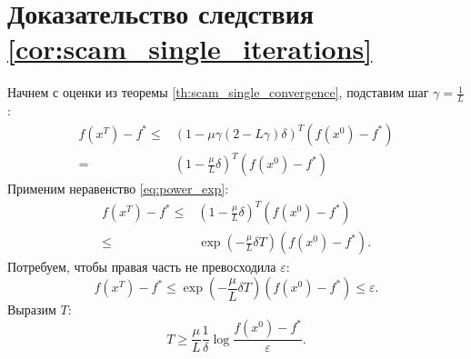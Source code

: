 \section{Доказательство следствия \ref{cor:scam_single_iterations}} \label{app:scam_single_iterations_proof}
    Начнем с оценки из теоремы \ref{th:scam_single_convergence}, подставим шаг $\gamma = \frac{1}{L}$:
    \begin{align*}
        f(x^T) - f^* \leq& (1 - \mu\gamma (2 - L \gamma) \delta)^T (f(x^0) - f^*) \\
        =& \left(1 - \frac{\mu}{L} \delta \right)^T (f(x^0) - f^*)
    \end{align*}
    Применим неравенство \eqref{eq:power_exp}:
    \begin{align*}
        f(x^T) - f^* \leq& \left(1 - \frac{\mu}{L} \delta \right)^T (f(x^0) - f^*) \\
        \leq& \exp\left(-\frac{\mu}{L} \delta T\right) (f(x^0) - f^*).
    \end{align*}
    Потребуем, чтобы правая часть не превосходила $\varepsilon$:
    \begin{equation*}
        f(x^T) - f^* \leq \exp\left(-\frac{\mu}{L} \delta T\right) (f(x^0) - f^*) \leq \varepsilon.
    \end{equation*}
    Выразим $T$:
    \begin{equation*}
        T \geq \frac{\mu}{L} \frac{1}{\delta} \log \frac{f(x^0) - f^*}{\varepsilon}.
    \end{equation*}